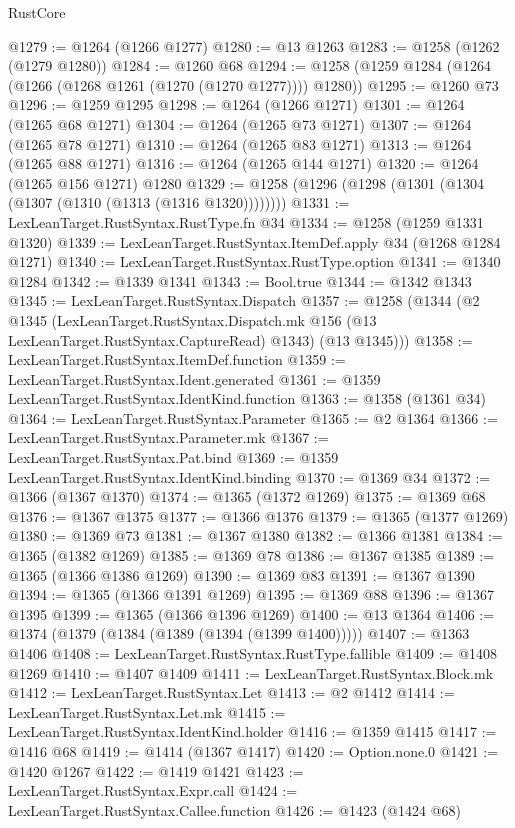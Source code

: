 \begin{lexlean}{RustCore}
\begin{coremodule}
{\begin{coremodule}
{{{{{{{{{{{{{{{{{{{{{{{{{{{{{{{{{{{{{{{{{{{{{{{@1279 := @1264 (@1266 @1277)
@1280 := @13 @1263
@1283 := @1258 (@1262 (@1279 @1280))
@1284 := @1260 @68
@1294 := @1258 (@1259 @1284 (@1264 (@1266 (@1268 @1261 (@1270 (@1270 @1277)))) @1280))
@1295 := @1260 @73
@1296 := @1259 @1295
@1298 := @1264 (@1266 @1271)
@1301 := @1264 (@1265 @68 @1271)
@1304 := @1264 (@1265 @73 @1271)
@1307 := @1264 (@1265 @78 @1271)
@1310 := @1264 (@1265 @83 @1271)
@1313 := @1264 (@1265 @88 @1271)
@1316 := @1264 (@1265 @144 @1271)
@1320 := @1264 (@1265 @156 @1271) @1280
@1329 := @1258 (@1296 (@1298 (@1301 (@1304 (@1307 (@1310 (@1313 (@1316 @1320))))))))
@1331 := LexLeanTarget.RustSyntax.RustType.fn @34
@1334 := @1258 (@1259 @1331 @1320)
@1339 := LexLeanTarget.RustSyntax.ItemDef.apply @34 (@1268 @1284 @1271)
@1340 := LexLeanTarget.RustSyntax.RustType.option
@1341 := @1340 @1284
@1342 := @1339 @1341
@1343 := Bool.true
@1344 := @1342 @1343
@1345 := LexLeanTarget.RustSyntax.Dispatch
@1357 := @1258
    (@1344
      (@2
        @1345
        (LexLeanTarget.RustSyntax.Dispatch.mk @156 (@13 LexLeanTarget.RustSyntax.CaptureRead) @1343)
        (@13 @1345)))
@1358 := LexLeanTarget.RustSyntax.ItemDef.function
@1359 := LexLeanTarget.RustSyntax.Ident.generated
@1361 := @1359 LexLeanTarget.RustSyntax.IdentKind.function
@1363 := @1358 (@1361 @34)
@1364 := LexLeanTarget.RustSyntax.Parameter
@1365 := @2 @1364
@1366 := LexLeanTarget.RustSyntax.Parameter.mk
@1367 := LexLeanTarget.RustSyntax.Pat.bind
@1369 := @1359 LexLeanTarget.RustSyntax.IdentKind.binding
@1370 := @1369 @34
@1372 := @1366 (@1367 @1370)
@1374 := @1365 (@1372 @1269)
@1375 := @1369 @68
@1376 := @1367 @1375
@1377 := @1366 @1376
@1379 := @1365 (@1377 @1269)
@1380 := @1369 @73
@1381 := @1367 @1380
@1382 := @1366 @1381
@1384 := @1365 (@1382 @1269)
@1385 := @1369 @78
@1386 := @1367 @1385
@1389 := @1365 (@1366 @1386 @1269)
@1390 := @1369 @83
@1391 := @1367 @1390
@1394 := @1365 (@1366 @1391 @1269)
@1395 := @1369 @88
@1396 := @1367 @1395
@1399 := @1365 (@1366 @1396 @1269)
@1400 := @13 @1364
@1406 := @1374 (@1379 (@1384 (@1389 (@1394 (@1399 @1400)))))
@1407 := @1363 @1406
@1408 := LexLeanTarget.RustSyntax.RustType.fallible
@1409 := @1408 @1269
@1410 := @1407 @1409
@1411 := LexLeanTarget.RustSyntax.Block.mk
@1412 := LexLeanTarget.RustSyntax.Let
@1413 := @2 @1412
@1414 := LexLeanTarget.RustSyntax.Let.mk
@1415 := LexLeanTarget.RustSyntax.IdentKind.holder
@1416 := @1359 @1415
@1417 := @1416 @68
@1419 := @1414 (@1367 @1417)
@1420 := Option.none.{0}
@1421 := @1420 @1267
@1422 := @1419 @1421
@1423 := LexLeanTarget.RustSyntax.Expr.call
@1424 := LexLeanTarget.RustSyntax.Callee.function
@1426 := @1423 (@1424 @68)
}}}}}}}}}}}}}}}}}}}}}}}}}}}}}}}}}}}}}}}}}}}}}}}
\end{coremodule}}
\end{coremodule}
\end{lexlean}
